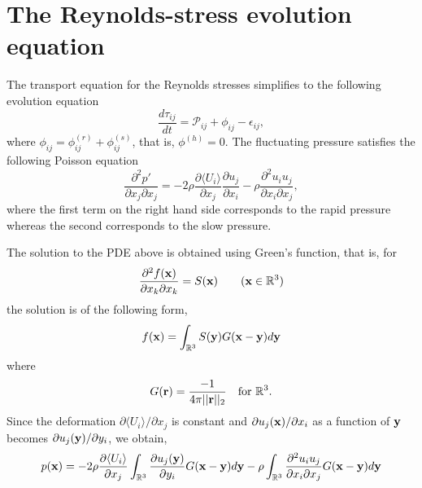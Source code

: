 \documentclass[oneside,a4paper,11pt]{report}
\newcommand{\pfluc}{p'}
\newcommand{\rs}{\tau}          %
\newcommand{\redi}{\phi}        %
\newcommand{\uiavg}{\langle U_i \rangle}
\newcommand{\uifluc}{u_i}
\newcommand{\ujfluc}{u_j}
\begin{document}
\section{The Reynolds-stress evolution equation}

The transport equation for the Reynolds stresses simplifies to the following evolution equation
\begin{equation}
\frac{d \rs_{ij}}{dt} = \mathcal{P}_{ij} +\redi_{ij} - \epsilon_{ij},
\end{equation}
where $\redi_{ij} = \redi^{(r)}_{ij} + \redi^{(s)}_{ij}$, that is, $\redi^{(h)} = 0$. The fluctuating pressure satisfies the following Poisson equation
\begin{equation}
\frac{\partial^2 \pfluc}{\partial x_j \partial x_j} = -2 \rho \frac{\partial \uiavg}{\partial x_j} \frac{\partial \ujfluc}{\partial x_i}  - \rho \frac{\partial^2 \uifluc \ujfluc}{\partial x_i \partial x_j},
\end{equation}
where the first term on the right hand side corresponds to the rapid pressure whereas the second corresponds to the slow pressure.

The solution to the PDE above is obtained using Green's function, that is, for 
\begin{equation}
\frac{\partial^2 f(\mathbf{x})}{\partial x_k \partial x_k} = S(\mathbf{x}) \qquad (\mathbf{x} \in {\mathbb{R}^3})
\end{equation}
the solution is of the following form, 
\begin{equation}
f(\mathbf{x}) = \int_{\mathbb{R}^3} S(\mathbf{y}) G(\mathbf{x} - \mathbf{y}) d\mathbf{y}
\end{equation}
where 
\begin{equation}
G(\mathbf{r}) = \frac{-1}{4\pi ||\mathbf{r}||_2} \quad \text{for } {\mathbb{R}^3}.
\end{equation}
Since the deformation $\partial \uiavg / \partial x_j$ is constant and $\partial u_j(\mathbf{x}) / \partial x_i$ as a function of $\mathbf{y}$ becomes $\partial u_j(\mathbf{y}) / \partial y_i$, we obtain,
\begin{equation}
\label{pfluc_homo}
p(\xvec) =  -2 \rho \frac{\partial \uiavg}{\partial x_j} \int_\Rthree \frac{\partial u_j(\yvec)}{\partial y_i} G(\xvec-\yvec) d\yvec - \rho \int_\Rthree \frac{\partial^2 \uifluc \ujfluc}{\partial x_i \partial x_j} G(\xvec - \yvec) d\yvec 
\end{equation}
\end{document}
